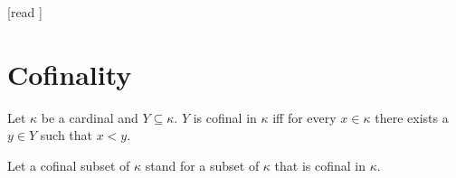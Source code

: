 \documentclass[10pt]{article}
\begin{document}
  \begin{imports}
    \begin{forthel}
      [read ]
    \end{forthel}
  \end{imports}


  \section*{Cofinality}

  \begin{forthel}
    \begin{definition}[id=SET_THEORY_06_5621203645212879,printid]
      Let $\kappa$ be a cardinal and $Y \subseteq \kappa$.
      $Y$ is cofinal in $\kappa$ iff for every $x \in \kappa$ there exists a $y \in Y$ such that $x < y$.
    \end{definition}

    Let a cofinal subset of $\kappa$ stand for a subset of $\kappa$ that is cofinal in $\kappa$.
  \end{forthel}
\end{document}
